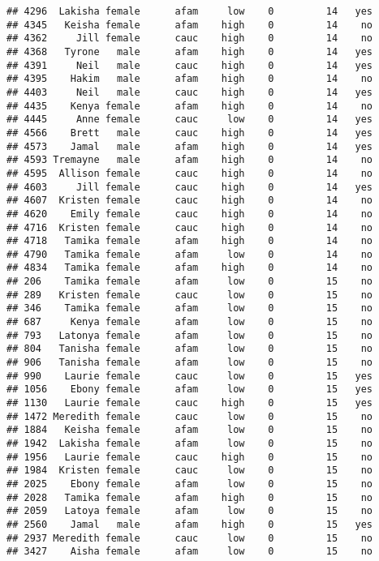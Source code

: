 \documentclass[
]{article}
\begin{document}
\begin{verbatim}
## 4296  Lakisha female      afam     low    0         14   yes
## 4345   Keisha female      afam    high    0         14    no
## 4362     Jill female      cauc    high    0         14    no
## 4368   Tyrone   male      afam    high    0         14   yes
## 4391     Neil   male      cauc    high    0         14   yes
## 4395    Hakim   male      afam    high    0         14    no
## 4403     Neil   male      cauc    high    0         14   yes
## 4435    Kenya female      afam    high    0         14    no
## 4445     Anne female      cauc     low    0         14   yes
## 4566    Brett   male      cauc    high    0         14   yes
## 4573    Jamal   male      afam    high    0         14   yes
## 4593 Tremayne   male      afam    high    0         14    no
## 4595  Allison female      cauc    high    0         14    no
## 4603     Jill female      cauc    high    0         14   yes
## 4607  Kristen female      cauc    high    0         14    no
## 4620    Emily female      cauc    high    0         14    no
## 4716  Kristen female      cauc    high    0         14    no
## 4718   Tamika female      afam    high    0         14    no
## 4790   Tamika female      afam     low    0         14    no
## 4834   Tamika female      afam    high    0         14    no
## 206    Tamika female      afam     low    0         15    no
## 289   Kristen female      cauc     low    0         15    no
## 346    Tamika female      afam     low    0         15    no
## 687     Kenya female      afam     low    0         15    no
## 793   Latonya female      afam     low    0         15    no
## 804   Tanisha female      afam     low    0         15    no
## 906   Tanisha female      afam     low    0         15    no
## 990    Laurie female      cauc     low    0         15   yes
## 1056    Ebony female      afam     low    0         15   yes
## 1130   Laurie female      cauc    high    0         15   yes
## 1472 Meredith female      cauc     low    0         15    no
## 1884   Keisha female      afam     low    0         15    no
## 1942  Lakisha female      afam     low    0         15    no
## 1956   Laurie female      cauc    high    0         15    no
## 1984  Kristen female      cauc     low    0         15    no
## 2025    Ebony female      afam     low    0         15    no
## 2028   Tamika female      afam    high    0         15    no
## 2059   Latoya female      afam     low    0         15    no
## 2560    Jamal   male      afam    high    0         15   yes
## 2937 Meredith female      cauc     low    0         15    no
## 3427    Aisha female      afam     low    0         15    no

\end{verbatim}
\end{document}
